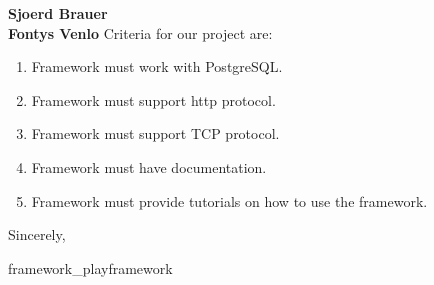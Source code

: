 \documentclass[11pt]{letter} %
\begin{document}
\begin{letter}{\large \bfseries Sjoerd Brauer\\ Fontys Venlo }
		Criteria for our project are:
		\begin{enumerate}
			\item Framework must work with PostgreSQL.
			\item Framework must support http protocol.
			\item Framework must support TCP protocol.
			\item Framework must have documentation.
			\item Framework must provide tutorials on how to use the framework.
		\end{enumerate}
	
		\closing{Sincerely,}
		
		
		
		
		
		
		
		 {framework_playframework}







	

		
		
		
		
		
		
	\end{letter}
	
\end{document}
